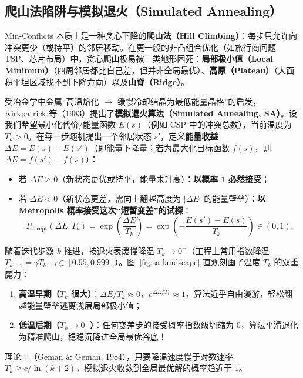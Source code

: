 \subsection{爬山法陷阱与模拟退火（Simulated Annealing）}

Min-Conflicts 本质上是一种贪心下降的\textbf{爬山法（Hill Climbing）}：每步只允许向冲突更少（或持平）的邻居移动。在更一般的非凸组合优化（如旅行商问题 TSP、芯片布局）中，贪心爬山极易被三类地形困死：\textbf{局部极小值（Local Minimum）}（四周邻居都比自己差，但并非全局最优）、\textbf{高原（Plateau）}（大面积平坦区域找不到下降方向）以及\textbf{山脊（Ridge）}。

受冶金学中金属“高温熔化 $\to$ 缓慢冷却结晶为最低能量晶格”的启发，Kirkpatrick 等（1983）提出了\textbf{模拟退火算法（Simulated Annealing, SA）}。设我们希望最小化代价/能量函数 $E(s)$（例如 CSP 中的冲突总数），当前温度为 $T_k > 0$。在每一步随机提出一个邻居状态 $s'$，定义\textbf{能量收益} $\Delta E = E(s) - E(s')$（即能量下降量；若为最大化目标函数 $f(s)$，则 $\Delta E = f(s') - f(s)$）：
\begin{itemize}
  \item 若 $\Delta E \ge 0$（新状态更优或持平，能量未升高）：\textbf{以概率 $1$ 必然接受}；
  \item 若 $\Delta E < 0$（新状态更差，需向上翻越高度为 $|\Delta E|$ 的能量壁垒）：\textbf{以 Metropolis 概率接受这次“短暂变差”的试探}：
  \begin{equation}\label{eq:metropolis}
    P_{\text{accept}}(\Delta E, T_k) = \exp\!\left(\frac{\Delta E}{T_k}\right) = \exp\!\left(-\frac{E(s') - E(s)}{T_k}\right) \in (0, 1).
  \end{equation}
\end{itemize}
随着迭代步数 $k$ 推进，按退火表缓慢降温 $T_k \to 0^+$（工程上常用指数降温 $T_{k+1} = \gamma T_k,\; \gamma\in[0.95,0.999]$）。图~\ref{fig:sa-landscape} 直观刻画了温度 $T_k$ 的双重魔力：
\begin{enumerate}
  \item \textbf{高温早期（$T_k$ 很大）}：$\Delta E / T_k \approx 0$，$e^{\Delta E/T_k} \approx 1$，算法近乎自由漫游，轻松翻越能量壁垒逃离浅层局部极小值；
  \item \textbf{低温后期（$T_k \to 0^+$）}：任何变差步的接受概率指数级坍缩为 $0$，算法平滑退化为精准爬山，稳稳沉降进全局最优谷底！
\end{enumerate}
理论上（Geman \& Geman, 1984），只要降温速度慢于对数速率 $T_k \ge c / \ln(k+2)$，模拟退火收敛到全局最优解的概率趋近于 $1$。

